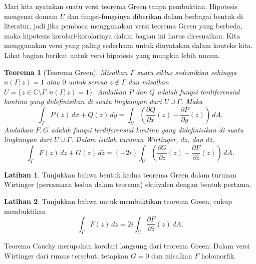 \documentclass[12pt,openany]{book}
\newcommand{\C}{{\mathbb{C}}}
\theoremstyle{plain}
\newtheorem{thm}{Teorema}[section]
\theoremstyle{remark}
\theoremstyle{definition}
\newenvironment{exbox}{%
    \def\FrameCommand{\vrule width 1pt \relax\hspace{10pt}}%
    \MakeFramed{\advance\hsize-\width\FrameRestore}%
}{%
    \endMakeFramed
}
\theoremstyle{exercise}
\newtheorem{exercise}{Latihan}[section]
\theoremstyle{example}
\begin{document}
Mari kita nyatakan suatu versi teorema Green tanpa pembuktian.
Hipotesis mengenai domain $U$ dan fungsi-fungsinya diberikan dalam berbagai bentuk di literatur,
jadi jika pembaca menggunakan versi teorema Green yang berbeda, maka
hipotesis korolari-korolarinya dalam bagian ini harus disesuaikan.
Kita menggunakan versi yang paling sederhana untuk dinyatakan dalam konteks kita.
Lihat bagian berikut untuk versi hipotesis yang mungkin lebih umum.

\begin{thm}[Teorema Green] \label{thm:greens}
Misalkan $\Gamma$ suatu siklus
sedemikian sehingga $n(\Gamma;z) = 1$ atau $0$ untuk semua $z \notin \Gamma$ dan misalkan
$U = \{ z \in \C \setminus \Gamma : n(\Gamma;z) = 1 \}$.
Andaikan 
$P$ dan $Q$ adalah fungsi terdiferensial kontinu yang didefinisikan di suatu lingkungan
dari $U \cup \Gamma$.
Maka
\begin{equation*}
\int_{\Gamma} P(z) \, dx + Q(z) \, dy
=
\int_{U}
\left(
\frac{\partial Q}{\partial x}(z)
-
\frac{\partial P}{\partial y}(z)
\right)
\, dA .
\end{equation*}
Andaikan $F,G$ adalah fungsi terdiferensial kontinu yang didefinisikan di suatu lingkungan
dari $U \cup \Gamma$.
Dalam istilah turunan Wirtinger, $dz$, dan $d \bar{z}$,
\begin{equation*}
\int_{\Gamma} F(z) \, dz + G(z) \, d\bar{z}
=
(-2i)
\int_{U}
\left(
\frac{\partial G}{\partial z}(z)
-
\frac{\partial F}{\partial \bar{z}}(z)
\right)
\, dA .
\end{equation*}
\end{thm}

\begin{exbox}
\begin{exercise}
Tunjukkan bahwa bentuk kedua teorema Green dalam turunan Wirtinger
(persamaan kedua dalam teorema) ekuivalen dengan bentuk pertama.
\end{exercise}

\begin{exercise} \label{exercise:shortgreen}
Tunjukkan bahwa untuk membuktikan teorema Green, cukup membuktikan
\begin{equation*}
\int_{\Gamma} F(z) \, dz
=
2i
\int_{U}
\frac{\partial F}{\partial \bar{z}}(z)
\, dA .
\end{equation*}
\end{exercise}
\end{exbox}

Teorema Cauchy merupakan korolari langsung dari teorema Green: Dalam versi
Wirtinger dari rumus tersebut, tetapkan $G=0$ dan misalkan $F$ holomorfik.
\end{document}
